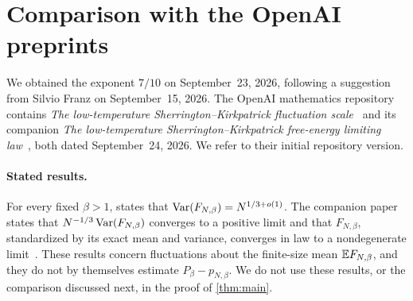 \section{Comparison with the OpenAI preprints}\label{subsec:intro-openai}

We obtained the exponent $7/10$ on September~23, 2026, following a
suggestion from Silvio Franz on September~15, 2026. The OpenAI
mathematics repository~\cite{OpenAIMathRepository} contains
\emph{The low-temperature Sherrington--Kirkpatrick fluctuation
scale}~\cite{OpenAIFluctuationScale} and its companion \emph{The
low-temperature Sherrington--Kirkpatrick free-energy limiting
law}~\cite{OpenAILimitingLaw}, both dated September~24, 2026. We refer
to their initial repository version.

\paragraph{Stated results.}
For every fixed $\beta>1$, \cite[Theorem~1.1]{OpenAIFluctuationScale}
states that $\operatorname{Var}(F_{N,\beta})=N^{1/3+o(1)}$. The companion paper states
that $N^{-1/3}\operatorname{Var}(F_{N,\beta})$ converges to a positive limit and that
$F_{N,\beta}$, standardized by its exact mean and variance, converges in
law to a nondegenerate limit~\cite[Theorems~1.1
and~1.2]{OpenAILimitingLaw}. These results concern fluctuations about
the finite-size mean $\mathbb E F_{N,\beta}$, and they do not by themselves
estimate $P_\beta-p_{N,\beta}$. We do not use these results, or the
comparison discussed next, in the proof of \cref{thm:main}.

